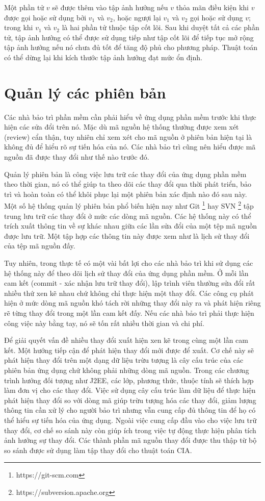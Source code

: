 \documentclass[12pt]{report}
\begin{document}
Một phần tử $v$ sẽ được thêm vào tập ảnh hưởng nếu $v$ thỏa mãn điều kiện khi $v$ được gọi hoặc sử dụng bởi $v_1$ và $v_2$, hoặc ngượi lại $v_1$ và $v_2$ gọi hoặc sử dụng $v$; trong khi $v_1$ và $v_2$ là hai phần tử thuộc tập cốt lõi. Sau khi duyệt tất cả các phần tử, tập ảnh hưởng có thể được sử dụng tiếp như tập cốt lõi để tiếp tục mở rộng tập ảnh hưởng nếu nó chưa đủ tốt để tăng độ phủ cho phương pháp. Thuật toán có thể dừng lại khi kích thước tập ảnh hưởng đạt mức ổn định.

\section{Quản lý các phiên bản}
Các nhà bảo trì phần mềm cần phải hiểu về ứng dụng phần mềm trước khi thực hiện các sửa đổi trên nó. Mặc dù mã nguồn hệ thống thường được xem xét (review) cẩn thận, tuy nhiên chỉ xem xét cho mã nguồn ở phiên bản hiện tại là không đủ để hiểu rõ sự tiến hóa của nó. Các nhà bảo trì cũng nên hiểu được mã nguồn đã được thay đổi như thế nào trước đó.

Quản lý phiên bản là công việc lưu trữ các thay đổi của ứng dụng phần mềm theo thời gian, nó có thể giúp ta theo dõi các thay đổi qua thời phát triển, bảo trì và hoàn toàn có thể khôi phục lại một phiên bản xác định nào đó sau này. Một số hệ thống quản lý phiên bản phổ biến hiện nay như Git \footnote{https://git-scm.com} hay SVN  \footnote{https://subversion.apache.org} tập trung lưu trữ các thay đổi ở mức các dòng mã nguồn. Các hệ thống này có thể trích xuất thông tin về sự khác nhau giữa các lần sửa đổi của một tệp mã nguồn được lưu trữ. Một tập hợp các thông tin này được xem như là lịch sử thay đổi của tệp mã nguồn đấy.

Tuy nhiên, trong thực tế có một vài bất lợi cho các nhà bảo trì khi sử dụng các hệ thống này để theo dõi lịch sử thay đổi của ứng dụng phần mềm. Ở mỗi lần cam kết (commit - xác nhận lưu trữ thay đổi), lập trình viên thường sửa đổi rất nhiều thứ xen kẽ nhau chứ không chỉ thực hiện một thay đổi. Các công cụ phát hiện ở mức dòng mã nguồn khó tách rời những thay đổi này ra và phát hiện riêng rẽ từng thay đổi trong một lần cam kết đấy. Nếu các nhà bảo trì phải thực hiện công việc này bằng tay, nó sẽ tốn rất nhiều thời gian và chi phí.

Để giải quyết vấn đề nhiều thay đổi xuất hiện xen kẽ trong cùng một lần cam kết. Một hướng tiếp cận để phát hiện thay đổi mới được để xuất. Cơ chế này sẽ phát hiện thay đổi trên một dạng dữ liệu trừu tượng là cây cấu trúc của các phiên bản ứng dụng chứ không phải những dòng mã nguồn. Trong các chương trình hướng đối tượng như J2EE, các lớp, phương thức, thuộc tính sẽ thích hợp làm đơn vị cho các thay đổi. Việc sử dụng cây cấu trúc làm dữ liệu để thực hiện phát hiện thay đổi so với dòng mã giúp trừu tượng hóa các thay đổi, giảm lượng thông tin cần xử lý cho người bảo trì nhưng vẫn cung cấp đủ thông tin để họ có thể hiểu sự tiến hóa của ứng dụng. Ngoài việc cung cấp đầu vào cho việc lưu trữ thay đổi, cơ chế so sánh này còn giúp ích trong việc tự động thực hiện phân tích ảnh hưởng sự thay đổi. Các thành phần mã nguồn thay đổi được thu thập từ bộ so sánh được sử dụng làm tập thay đổi cho thuật toán CIA.
\end{document}
